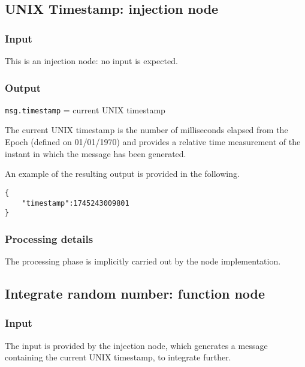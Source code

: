 \documentclass[a4paper,11pt]{article} %
\begin{document}
    \subsection{UNIX Timestamp: injection node}\label{subsec:unix-timestamp:-injection-node}

    \subsubsection{Input}

    This is an injection node: no input is expected.

    \subsubsection{Output}

    \texttt{msg.timestamp} = current UNIX timestamp

    \medskip

    The current UNIX timestamp is the number of milliseconds elapsed from the Epoch (defined on 01/01/1970) and provides a relative time measurement of the instant in which the message has been generated.

    An example of the resulting output is provided in the following.

    \begin{verbatim}
{
    "timestamp":1745243009801
}
    \end{verbatim}

    \subsubsection{Processing details}

    The processing phase is implicitly carried out by the node implementation.

    \subsection{Integrate random number: function node}\label{subsec:integrate-random-number:-function-node}

    \subsubsection{Input}

    The input is provided by the injection node, which generates a message containing the current UNIX timestamp, to integrate further.
\end{document}
